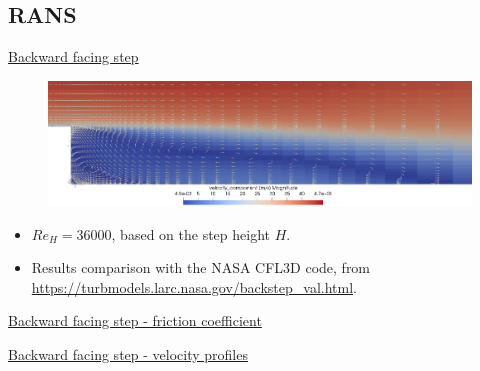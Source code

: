 \documentclass{beamer}
\begin{document}
\subsection*{RANS}
\begin{frame}[label=bfs]{\hyperlink{bfsSupp}{Backward facing step}}
\begin{figure}
	\centering
	\includegraphics[width=\textwidth]{bfs_glimphs.png}
\end{figure}
\vspace{0.5cm}
\begin{itemize}
	\item $Re_H = 36000$, based on the step height $H$.
	\item Results comparison with the NASA CFL3D code, from 
	{\small \url{https://turbmodels.larc.nasa.gov/backstep_val.html}}.
\end{itemize}

\end{frame}
\begin{frame}{\hyperlink{bfsSupp}{Backward facing step - friction coefficient}}
\begin{figure}
	\centering
	
\end{figure}
\end{frame}
\begin{frame}{\hyperlink{bfsSupp}{Backward facing step - velocity profiles}}
\vspace{-0.7cm}
\begin{figure}
	\subfloat[\tiny Profile at 
	$x/H=1$]{\hspace{-1cm}}
	\subfloat[\tiny Profile at $x/H=6$]{}
\end{figure}
\end{frame}
\end{document}
